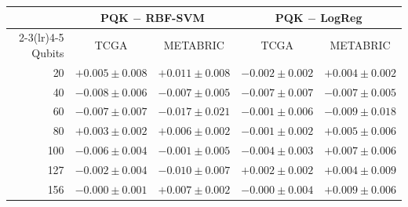 \begin{tabular}{rcccc}
\toprule
 & \multicolumn{2}{c}{PQK $-$ RBF-SVM} & \multicolumn{2}{c}{PQK $-$ LogReg} \\
\cmidrule(lr){2-3}\cmidrule(lr){4-5}
Qubits & TCGA & METABRIC & TCGA & METABRIC \\
\midrule
20 & $+0.005\pm0.008$ & $+0.011\pm0.008$ & $-0.002\pm0.002$ & $+0.004\pm0.002$ \\
40 & $-0.008\pm0.006$ & $-0.007\pm0.005$ & $-0.007\pm0.007$ & $-0.007\pm0.005$ \\
60 & $-0.007\pm0.007$ & $-0.017\pm0.021$ & $-0.001\pm0.006$ & $-0.009\pm0.018$ \\
80 & $+0.003\pm0.002$ & $+0.006\pm0.002$ & $-0.001\pm0.002$ & $+0.005\pm0.006$ \\
100 & $-0.006\pm0.004$ & $-0.001\pm0.005$ & $-0.004\pm0.003$ & $+0.007\pm0.006$ \\
127 & $-0.002\pm0.004$ & $-0.010\pm0.007$ & $+0.002\pm0.002$ & $+0.004\pm0.009$ \\
156 & $-0.000\pm0.001$ & $+0.007\pm0.002$ & $-0.000\pm0.004$ & $+0.009\pm0.006$ \\
\bottomrule
\end{tabular}
